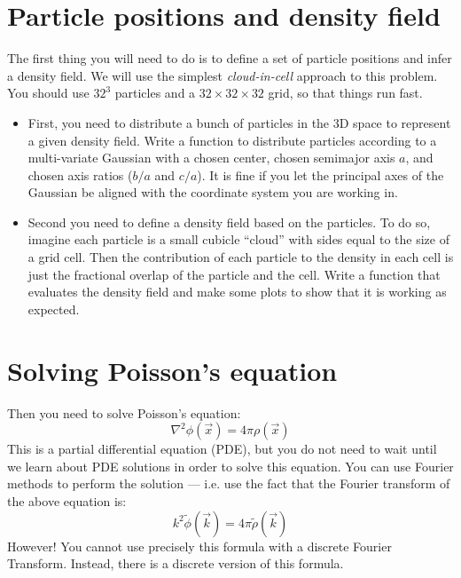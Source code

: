 \documentclass[11pt, preprint]{aastex}
\begin{document}
\section{Particle positions and density field}

The first thing you will need to do is to define a set of particle
positions and infer a density field. We will use the simplest {\it
  cloud-in-cell} approach to this problem. You should use $32^3$
particles and a $32\times 32\times 32$ grid, so that things run fast.

\begin{itemize}
\item First, you need to distribute a bunch of particles in the 3D
  space to represent a given density field. Write a function to
  distribute particles according to a multi-variate Gaussian with a
  chosen center, chosen semimajor axis $a$, and chosen axis ratios
  ($b/a$ and $c/a$). It is fine if you let the principal axes of the
  Gaussian be aligned with the coordinate system you are working in.
\item Second you need to define a density field based on the
  particles. To do so, imagine each particle is a small cubicle
  ``cloud'' with sides equal to the size of a grid cell. Then the
  contribution of each particle to the density in each cell is just
  the fractional overlap of the particle and the cell. Write a
  function that evaluates the density field and make some plots to
  show that it is working as expected.
\end{itemize}

\section{Solving Poisson's equation}

Then you need to solve Poisson's equation:
\begin{equation}
\nabla^2 \phi(\vec{x}) = 4\pi \rho(\vec{x})
\end{equation}
This is a partial differential equation (PDE), but you do not need to
wait until we learn about PDE solutions in order to solve this
equation. You can use Fourier methods to perform the solution ---
i.e. use the fact that the Fourier transform of the above equation is:
\begin{equation}
k^2 \tilde\phi(\vec{k}) = 4\pi \tilde\rho(\vec{k})
\end{equation}
However! You cannot use precisely this formula with a discrete Fourier
Transform. Instead, there is a discrete version of this formula. 
\end{document}

